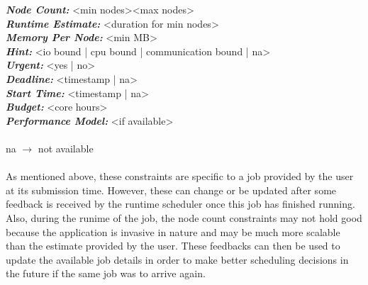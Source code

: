 \clearpage
\noindent
\textbf{\textit{Node Count:}} <min nodes><max nodes>\\
\textbf{\textit{Runtime Estimate:}} <duration for min nodes>\\
\textbf{\textit{Memory Per Node:}} <min MB>\\
\textbf{\textit{Hint:}} <io bound | cpu bound | communication bound | na>\\
\textbf{\textit{Urgent:}} <yes | no> \\
\textbf{\textit{Deadline:}} <timestamp | na>\\
\textbf{\textit{Start Time:}} <timestamp | na>\\
\textbf{\textit{Budget:}} <core hours>\\
\textbf{\textit{Performance Model:}} <if available>\\ \\
na $\rightarrow$ not available\\ \\
As mentioned above, these constraints are specific to a job provided by the user at its submission time. However, these can change or be updated after some feedback is received by the runtime scheduler once this job has finished running. Also, during the runime of the job, the node count constraints may not hold good because the application is invasive in nature and may be much more scalable than the estimate provided by the user. These feedbacks can then be used to update the available job details in order to make better scheduling decisions in the future if the same job was to arrive again.
